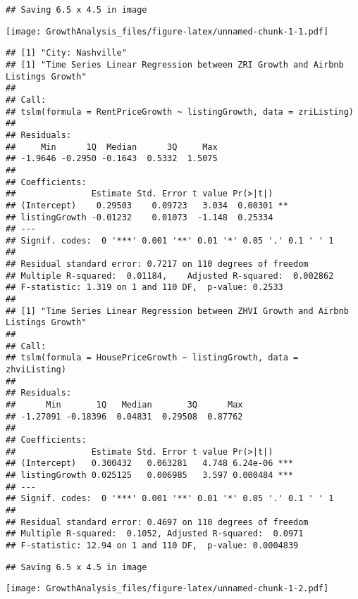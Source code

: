 \documentclass[
]{article}
\begin{document}
\begin{verbatim}
## Saving 6.5 x 4.5 in image
\end{verbatim}

\texttt{[image: GrowthAnalysis\_files/figure-latex/unnamed-chunk-1-1.pdf]}

\begin{verbatim}
## [1] "City: Nashville"
## [1] "Time Series Linear Regression between ZRI Growth and Airbnb Listings Growth"
## 
## Call:
## tslm(formula = RentPriceGrowth ~ listingGrowth, data = zriListing)
## 
## Residuals:
##     Min      1Q  Median      3Q     Max 
## -1.9646 -0.2950 -0.1643  0.5332  1.5075 
## 
## Coefficients:
##               Estimate Std. Error t value Pr(>|t|)   
## (Intercept)    0.29503    0.09723   3.034  0.00301 **
## listingGrowth -0.01232    0.01073  -1.148  0.25334   
## ---
## Signif. codes:  0 '***' 0.001 '**' 0.01 '*' 0.05 '.' 0.1 ' ' 1
## 
## Residual standard error: 0.7217 on 110 degrees of freedom
## Multiple R-squared:  0.01184,    Adjusted R-squared:  0.002862 
## F-statistic: 1.319 on 1 and 110 DF,  p-value: 0.2533
## 
## [1] "Time Series Linear Regression between ZHVI Growth and Airbnb Listings Growth"
## 
## Call:
## tslm(formula = HousePriceGrowth ~ listingGrowth, data = zhviListing)
## 
## Residuals:
##      Min       1Q   Median       3Q      Max 
## -1.27091 -0.18396  0.04831  0.29508  0.87762 
## 
## Coefficients:
##               Estimate Std. Error t value Pr(>|t|)    
## (Intercept)   0.300432   0.063281   4.748 6.24e-06 ***
## listingGrowth 0.025125   0.006985   3.597 0.000484 ***
## ---
## Signif. codes:  0 '***' 0.001 '**' 0.01 '*' 0.05 '.' 0.1 ' ' 1
## 
## Residual standard error: 0.4697 on 110 degrees of freedom
## Multiple R-squared:  0.1052, Adjusted R-squared:  0.0971 
## F-statistic: 12.94 on 1 and 110 DF,  p-value: 0.0004839
\end{verbatim}

\begin{verbatim}
## Saving 6.5 x 4.5 in image
\end{verbatim}

\texttt{[image: GrowthAnalysis\_files/figure-latex/unnamed-chunk-1-2.pdf]}
\end{document}
